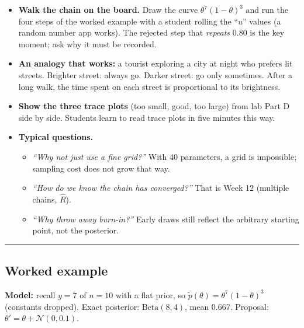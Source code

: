 \begin{itemize}
\tightlist
\item
  \textbf{Walk the chain on the board.} Draw the curve
  \(\theta^7(1-\theta)^3\) and run the four steps of the worked example
  with a student rolling the ``\(u\)'' values (a random number app
  works). The rejected step that \emph{repeats} 0.80 is the key moment;
  ask why it must be recorded.
\item
  \textbf{An analogy that works:} a tourist exploring a city at night
  who prefers lit streets. Brighter street: always go. Darker street: go
  only sometimes. After a long walk, the time spent on each street is
  proportional to its brightness.
\item
  \textbf{Show the three trace plots} (too small, good, too large) from
  lab Part D side by side. Students learn to read trace plots in five
  minutes this way.
\item
  \textbf{Typical questions.}

  \begin{itemize}
  \tightlist
  \item
    \emph{``Why not just use a fine grid?''} With 40 parameters, a grid
    is impossible; sampling cost does not grow that way.
  \item
    \emph{``How do we know the chain has converged?''} That is Week 12
    (multiple chains, \(\hat R\)).
  \item
    \emph{``Why throw away burn-in?''} Early draws still reflect the
    arbitrary starting point, not the posterior.
  \end{itemize}
\end{itemize}

\begin{center}\rule{0.5\linewidth}{0.5pt}\end{center}

\subsection{Worked example}

\textbf{Model:} recall \(y = 7\) of \(n = 10\) with a flat prior, so
\(\tilde p(\theta) = \theta^7(1-\theta)^3\) (constants dropped). Exact
posterior: \(\mathrm{Beta}(8, 4)\), mean 0.667. Proposal:
\(\theta' = \theta + \mathcal{N}(0, 0.1)\).


